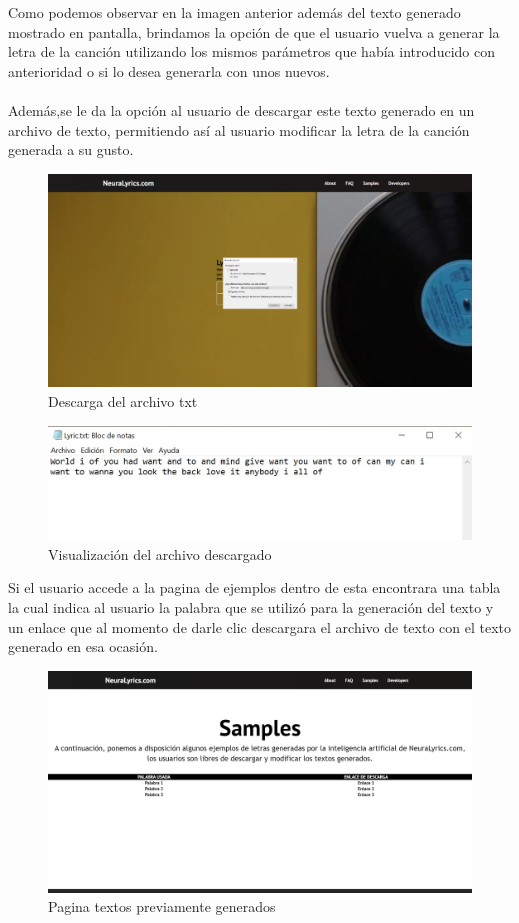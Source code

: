 \documentclass[12pt, a4paper, titlepage]{article}
\begin{document}
	Como podemos observar en la imagen anterior además del texto generado mostrado en pantalla, brindamos la opción de que el usuario vuelva a generar la letra de la canción utilizando los mismos parámetros que había introducido con anterioridad o si lo desea generarla con unos nuevos.\\\\ 
	Además,se le da la opción al usuario de descargar este texto generado en un archivo de texto, permitiendo así al usuario modificar la letra de la canción generada a su gusto.	
	\begin{figure}[H] 
		\includegraphics[width=13.5cm]{./Imagenes/Capturas/pdescarga.jpg}
		\centering \caption{Descarga del archivo txt}
	\end{figure}
	\begin{figure}[H] 
	\includegraphics[width=13.5cm]{./Imagenes/Capturas/pvisualizacion.jpg}
	\centering \caption{Visualización del archivo descargado}
	\end{figure}
	Si el usuario accede a la pagina de ejemplos dentro de esta encontrara una tabla la cual indica al usuario la palabra que se utilizó para la generación del texto y un enlace que al momento de darle clic descargara el archivo de texto con el texto generado en esa ocasión.
	\begin{figure}[H] 
		\includegraphics[width=13.5cm]{./Imagenes/Capturas/pejemplos.png}
		\centering \caption{Pagina textos previamente generados}
	\end{figure}
\end{document}
